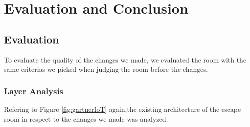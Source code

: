 
\chapter{Evaluation and Conclusion} %

\label{Chapter5} %

\section{Evaluation}


To evaluate the quality of the changes we made, 
we evaluated the room with the same criterias we picked when judging the room before the changes.

\subsection{Layer Analysis}
Refering to Figure \ref{fig:gartnerIoT} again,the existing architecture of the escape room in respect to the changes we made was analyzed.
